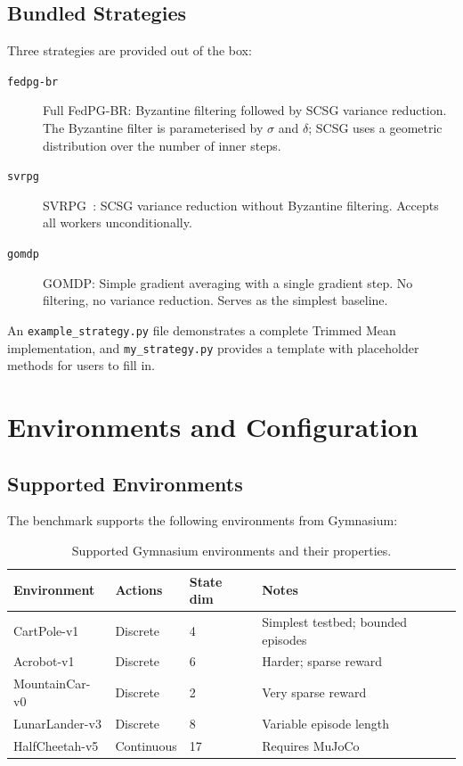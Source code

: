\subsection{Bundled Strategies}

Three strategies are provided out of the box:

\begin{description}
    \item[\texttt{fedpg-br}] Full FedPG-BR: Byzantine filtering followed by SCSG
         variance reduction. The Byzantine filter is parameterised by $\sigma$ and
         $\delta$; SCSG uses a geometric distribution over the number of inner steps.
    \item[\texttt{svrpg}] SVRPG~\cite{papini2018svrpg}: SCSG variance reduction
         without Byzantine filtering. Accepts all workers unconditionally.
    \item[\texttt{gomdp}] GOMDP: Simple gradient averaging with a single gradient
         step. No filtering, no variance reduction. Serves as the simplest baseline.
\end{description}

An \texttt{example\_strategy.py} file demonstrates a complete Trimmed Mean
implementation, and \texttt{my\_strategy.py} provides a template with placeholder
methods for users to fill in.

\section{Environments and Configuration}

\subsection{Supported Environments}

The benchmark supports the following environments from Gymnasium:

\begin{table}[htbp]
\centering
\begin{tabular}{llll}
\hline
\textbf{Environment} & \textbf{Actions} & \textbf{State dim} & \textbf{Notes} \\
\hline
CartPole-v1       & Discrete   & 4  & Simplest testbed; bounded episodes \\
Acrobot-v1        & Discrete   & 6  & Harder; sparse reward \\
MountainCar-v0    & Discrete   & 2  & Very sparse reward \\
LunarLander-v3    & Discrete   & 8  & Variable episode length \\
HalfCheetah-v5    & Continuous & 17 & Requires MuJoCo \\
\hline
\end{tabular}
\caption{Supported Gymnasium environments and their properties.}
\label{tab:envs}
\end{table}

